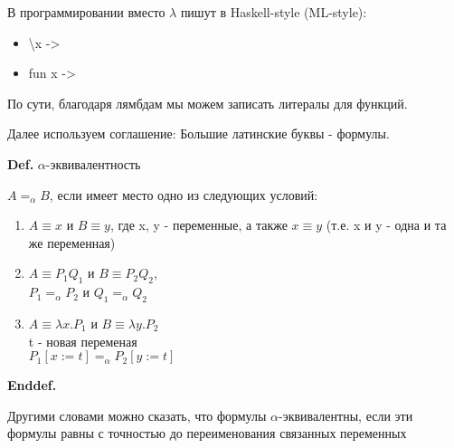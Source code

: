 \documentclass[12pt]{extreport}
\begin{document}
В программировании вместо $\lambda$ пишут в Haskell-style (ML-style):
\begin{itemize}[leftmargin=2cm]
    \item \textbackslash x ->
    \item fun x ->
\end{itemize}

По сути, благодаря лямбдам мы можем записать литералы для функций.

Далее используем соглашение: Большие латинские буквы - формулы.

\noindent\textbf{Def.} $\alpha$-эквивалентность

$A =_\alpha B$, если имеет место одно из следующих условий:
\begin{enumerate}[leftmargin=2cm]
    \item $A \equiv x$ и $B \equiv y$, где x, y - переменные, а также $x \equiv y$ (т.е. x и y - одна и та же переменная)
    \item $A \equiv P_1Q_1$ и $B \equiv P_2Q_2$, \\
          $P_1 =_\alpha P_2$ и $Q_1 =_\alpha Q_2$    
    \item $A \equiv \lambda x.P_1$ и $B \equiv \lambda y.P_2$ \\
          t - новая переменая \\
          $P_1[x := t] =_\alpha P_2[y := t]$
\end{enumerate}

\noindent\textbf{Enddef.}

Другими словами можно сказать, что формулы $\alpha$-эквивалентны, если эти формулы равны с точностью до переименования связанных переменных
\end{document}
